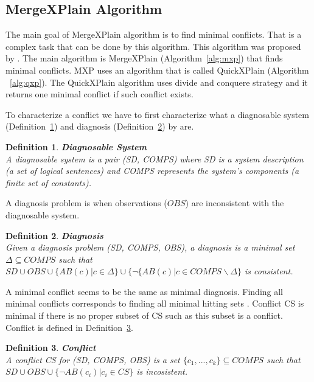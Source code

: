 \documentclass[12pt,a4paper]{article}
\newtheorem{definition}{Definition}[subsection]
\begin{document}
\subsection{MergeXPlain Algorithm}
The main goal of MergeXPlain algorithm is to find minimal conflicts. That is a complex task that can be done by this algorithm. This algorithm was proposed by \cite{MXP}. The main algorithm is MergeXPlain (Algorithm~\ref{alg:mxp}) that finds minimal conflicts. MXP uses an algorithm that is called QuickXPlain (Algorithm ~\ref{alg:qxp}). The QuickXPlain algorithm uses divide and conquere strategy and it returns one minimal conflict if such conflict exists. 

To characterize a conflict we have to first characterize what a diagnosable system (Definition~\ref{def:diagnosableSystem}) and diagnosis (Definition~\ref{def:diagnosis}) by \cite{reiterHS} are.

\begin{definition}{\textbf{Diagnosable System}} \\
	\label{def:diagnosableSystem}
	\noindent A diagnosable system is a pair (SD, COMPS) where SD is a system description (a set of logical sentences) and COMPS represents the system's components (a finite set of constants).
\end{definition}

A diagnosis problem is when observations ($OBS$) are inconsistent with the diagnosable system.

\begin{definition}{\textbf{Diagnosis}} \\
	\label{def:diagnosis}
	\noindent Given a diagnosis problem (SD, COMPS, OBS), a diagnosis is a minimal set $\Delta \subseteq COMPS$ such that $SD \cup OBS \cup \{ AB(c) | c \in \Delta \} \cup \{ \neg \{AB(c) | c \in COMPS \backslash \Delta \}$ is consistent.
\end{definition}

A minimal conflict seems to be the same as minimal diagnosis. Finding all minimal conflicts corresponds to finding all minimal hitting sets \citep{reiterHS}. Conflict CS is minimal if there is no proper subset of CS such as this subset is a conflict. Conflict is defined in Definition~\ref{def:conflict}.

\begin{definition}{\textbf{Conflict}} \\
	\label{def:conflict}
	\noindent A conflict CS for (SD, COMPS, OBS) is a set $\{c_{1}, ..., c_{k}\} \subseteq COMPS$ such that $SD \cup OBS \cup \{ \neg AB(c_{i}) | c_{i} \in CS \} $ is incosistent.
\end{definition}
\end{document}
